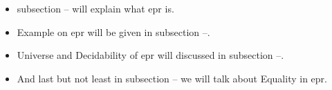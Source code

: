 	\begin{itemize}
		\item subsection -- will explain what \ac{epr} is.
		\item Example on \ac{epr} will be given in subsection --.
		\item Universe and Decidability of \ac{epr} will discussed in subsection --.
		\item And last but not least in subsection -- we will talk about Equality in \ac{epr}. 
	\end{itemize}


	




\begin{comment}
	

	

	

	
\end{comment}


   